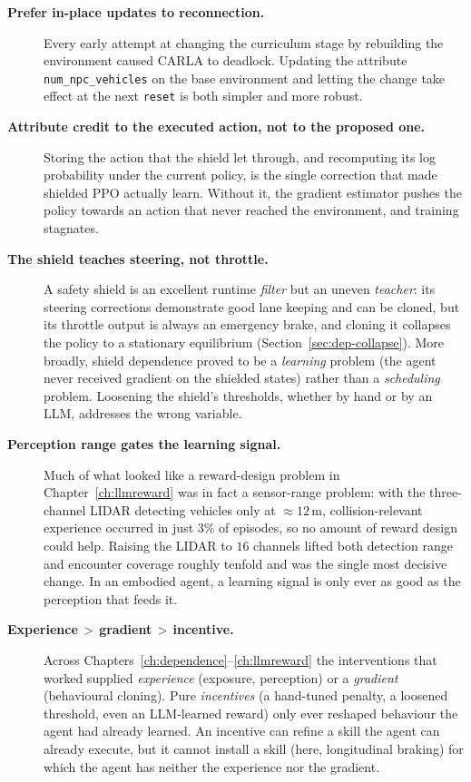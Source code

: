\begin{description}
  \item[\textbf{Prefer in-place updates to reconnection.}] Every early attempt at changing the
        curriculum stage by rebuilding the environment caused CARLA to deadlock. Updating the
        attribute \texttt{num\_npc\_vehicles} on the base environment and letting the change
        take effect at the next \texttt{reset} is both simpler and more robust.
  \item[\textbf{Attribute credit to the executed action, not to the proposed one.}] Storing the
        action that the shield let through, and recomputing its log probability under the
        current policy, is the single correction that made shielded PPO actually learn.
        Without it, the gradient estimator pushes the policy towards an action that never
        reached the environment, and training stagnates.
  \item[\textbf{The shield teaches steering, not throttle.}] A safety shield is an excellent
        runtime \emph{filter} but an uneven \emph{teacher}: its steering corrections demonstrate
        good lane keeping and can be cloned, but its throttle output is always an emergency brake,
        and cloning it collapses the policy to a stationary equilibrium
        (Section~\ref{sec:dep-collapse}). More broadly, shield dependence proved to be a
        \emph{learning} problem (the agent never received gradient on the shielded states)
        rather than a \emph{scheduling} problem. Loosening the shield's thresholds, whether by
        hand or by an LLM, addresses the wrong variable.
  \item[\textbf{Perception range gates the learning signal.}] Much of what looked like a
        reward-design problem in Chapter~\ref{ch:llmreward} was in fact a sensor-range problem: with
        the three-channel LIDAR detecting vehicles only at \(\approx12\,\mathrm{m}\), collision-relevant
        experience occurred in just \(3\%\) of episodes, so no amount of reward design could help.
        Raising the LIDAR to \(16\) channels lifted both detection range and encounter coverage
        roughly tenfold and was the single most decisive change. In an embodied agent, a learning
        signal is only ever as good as the perception that feeds it.
  \item[\textbf{Experience\,$>$\,gradient\,$>$\,incentive.}] Across
        Chapters~\ref{ch:dependence}--\ref{ch:llmreward} the interventions that worked supplied
        \emph{experience} (exposure, perception) or a \emph{gradient} (behavioural cloning).
        Pure \emph{incentives} (a hand-tuned penalty, a loosened threshold, even an LLM-learned
        reward) only ever reshaped behaviour the agent had already learned. An incentive can refine
        a skill the agent can already execute, but it cannot install a skill (here, longitudinal
        braking) for which the agent has neither the experience nor the gradient.
\end{description}

